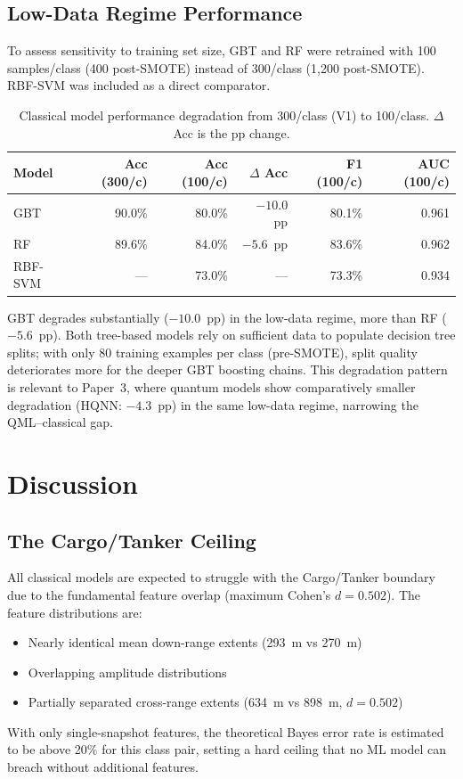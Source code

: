 \documentclass[journal]{IEEEtran}
\begin{document}
\subsection{Low-Data Regime Performance}
\label{sec:lowdata}

To assess sensitivity to training set size, GBT and RF were retrained with
100 samples/class (400 post-SMOTE) instead of 300/class (1,200 post-SMOTE).
RBF-SVM was included as a direct comparator.

\begin{table}[H]
\centering
\caption{Classical model performance degradation from 300/class (V1) to 100/class.
         $\Delta$ Acc is the pp change.}
\begin{tabular}{lrrrrr}
\toprule
\textbf{Model} & \textbf{Acc (300/c)} & \textbf{Acc (100/c)} & \textbf{$\Delta$ Acc}
               & \textbf{F1 (100/c)} & \textbf{AUC (100/c)} \\
\midrule
GBT     & 90.0\% & 80.0\% & $-10.0$~pp & 80.1\% & 0.961 \\
RF      & 89.6\% & 84.0\% & $-5.6$~pp  & 83.6\% & 0.962 \\
RBF-SVM & —      & 73.0\% & —          & 73.3\% & 0.934 \\
\bottomrule
\end{tabular}
\end{table}

\noindent GBT degrades substantially ($-10.0$~pp) in the low-data regime,
more than RF ($-5.6$~pp). Both tree-based models rely on sufficient
data to populate decision tree splits; with only 80 training examples per class
(pre-SMOTE), split quality deteriorates more for the deeper GBT boosting chains.
This degradation pattern is relevant to Paper~3, where quantum models show
comparatively smaller degradation (HQNN: $-4.3$~pp) in the same low-data
regime, narrowing the QML--classical gap.

\section{Discussion}
\label{sec:discussion}

\subsection{The Cargo/Tanker Ceiling}

All classical models are expected to struggle with the Cargo/Tanker boundary
due to the fundamental feature overlap (maximum Cohen's $d = 0.502$).
The feature distributions are:
\begin{itemize}
  \item Nearly identical mean down-range extents (293~m vs 270~m)
  \item Overlapping amplitude distributions
  \item Partially separated cross-range extents (634~m vs 898~m, $d=0.502$)
\end{itemize}
With only single-snapshot features, the theoretical Bayes error rate is
estimated to be above 20\% for this class pair, setting a hard ceiling that
no ML model can breach without additional features.
\end{document}
